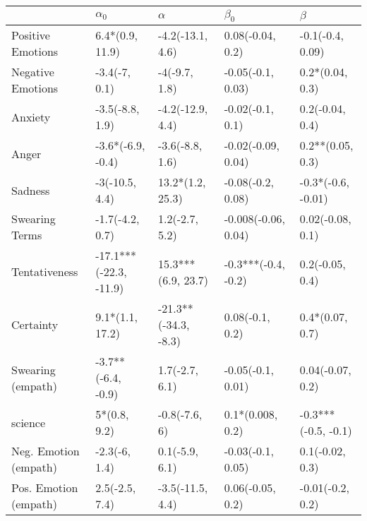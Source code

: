 \begin{tabular}{lllll}
\toprule
{} &              $\alpha_0$ &              $\alpha$ &            $\beta_0$ &              $\beta$ \\
\midrule
Positive Emotions     &         6.4*(0.9, 11.9) &      -4.2(-13.1, 4.6) &     0.08(-0.04, 0.2) &     -0.1(-0.4, 0.09) \\
Negative Emotions     &           -3.4(-7, 0.1) &         -4(-9.7, 1.8) &    -0.05(-0.1, 0.03) &      0.2*(0.04, 0.3) \\
Anxiety               &         -3.5(-8.8, 1.9) &      -4.2(-12.9, 4.4) &     -0.02(-0.1, 0.1) &      0.2(-0.04, 0.4) \\
Anger                 &       -3.6*(-6.9, -0.4) &       -3.6(-8.8, 1.6) &   -0.02(-0.09, 0.04) &     0.2**(0.05, 0.3) \\
Sadness               &          -3(-10.5, 4.4) &      13.2*(1.2, 25.3) &    -0.08(-0.2, 0.08) &   -0.3*(-0.6, -0.01) \\
Swearing Terms        &         -1.7(-4.2, 0.7) &        1.2(-2.7, 5.2) &  -0.008(-0.06, 0.04) &     0.02(-0.08, 0.1) \\
Tentativeness         &  -17.1***(-22.3, -11.9) &    15.3***(6.9, 23.7) &  -0.3***(-0.4, -0.2) &      0.2(-0.05, 0.4) \\
Certainty             &         9.1*(1.1, 17.2) &  -21.3**(-34.3, -8.3) &      0.08(-0.1, 0.2) &      0.4*(0.07, 0.7) \\
Swearing (empath)     &      -3.7**(-6.4, -0.9) &        1.7(-2.7, 6.1) &    -0.05(-0.1, 0.01) &     0.04(-0.07, 0.2) \\
science               &            5*(0.8, 9.2) &         -0.8(-7.6, 6) &     0.1*(0.008, 0.2) &  -0.3***(-0.5, -0.1) \\
Neg. Emotion (empath) &           -2.3(-6, 1.4) &        0.1(-5.9, 6.1) &    -0.03(-0.1, 0.05) &      0.1(-0.02, 0.3) \\
Pos. Emotion (empath) &          2.5(-2.5, 7.4) &      -3.5(-11.5, 4.4) &     0.06(-0.05, 0.2) &     -0.01(-0.2, 0.2) \\
\bottomrule
\end{tabular}
